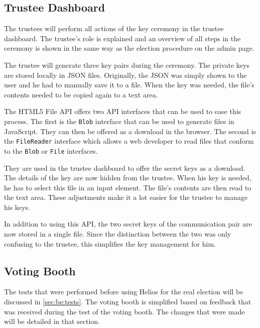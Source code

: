 \subsection{Trustee Dashboard}

The trustees will perform all actions of the key ceremony in the trustee dashboard. The trustee's role is explained and an overview of all steps in the ceremony is shown in the same way as the election procedure on the admin page.

\par The trustee will generate three key pairs during the ceremony. The private keys are stored locally in JSON files. Originally, the JSON was simply shown to the user and he had to manually save it to a file. When the key was needed, the file's contents needed to be copied again to a text area.

\par The HTML5 File API offers two API interfaces that can be used to ease this process.\cite{ranganathan_sicking_file_api} The first is the \texttt{Blob} interface that can be used to generate files in JavaScript. They can then be offered as a download in the browser. The second is the \texttt{FileReader} interface which allows a web developer to read files that conform to the \texttt{Blob} or \texttt{File} interfaces.

\par They are used in the trustee dashboard to offer the secret keys as a download. The details of the key are now hidden from the trustee. When his key is needed, he has to select this file in an input element. The file's contents are then read to the text area. These adjustments make it a lot easier for the trustee to manage his keys.

\par In addition to using this API, the two secret keys of the communication pair are now stored in a single file. Since the distinction between the two was only confusing to the trustee, this simplifies the key management for him.

\subsection{Voting Booth}

The tests that were performed before using Helios for the real election will be discussed in \ref{sec:be:tests}. The voting booth is simplified based on feedback that was received during the test of the voting booth. The changes that were made will be detailed in that section.